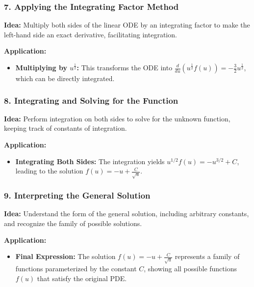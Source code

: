 \documentclass[a4paper,12pt]{book}
\begin{document}
\subsubsection{7. Applying the Integrating Factor Method}

\textbf{Idea:} Multiply both sides of the linear ODE by an integrating factor to make the left-hand side an exact derivative, facilitating integration.

\textbf{Application:}
\begin{itemize}
\item 
\textbf{Multiplying by \( u^{\frac{1}{2}} \):} This transforms the ODE into \( \frac{d}{du} \left( u^{\frac{1}{2}} f(u) \right) = -\frac{3}{2} u^{\frac{1}{2}} \), which can be directly integrated.

\end{itemize}

\subsubsection{8. Integrating and Solving for the Function}

\textbf{Idea:} Perform integration on both sides to solve for the unknown function, keeping track of constants of integration.

\textbf{Application:}
\begin{itemize}
\item 
\textbf{Integrating Both Sides:} The integration yields \( u^{1/2} f(u) = -u^{3/2} + C \), leading to the solution \( f(u) = -u + \frac{C}{\sqrt{u}} \).

\end{itemize}

\subsubsection{9. Interpreting the General Solution}

\textbf{Idea:} Understand the form of the general solution, including arbitrary constants, and recognize the family of possible solutions.

\textbf{Application:}
\begin{itemize}
\item 
\textbf{Final Expression:} The solution \( f(u) = -u + \frac{C}{\sqrt{u}} \) represents a family of functions parameterized by the constant \( C \), showing all possible functions \( f(u) \) that satisfy the original PDE.

\end{itemize}
\end{document}
